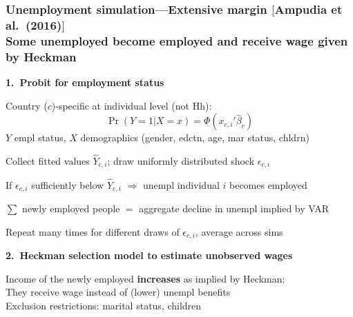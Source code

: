 \documentclass[pdflatex,aspectratio=169]{beamer}
\newcommand{\jemph}[1]{{\color{StataDarkBlue}#1}}
\newcommand{\jbemph}[1]{\textbf{\color{SlideNavy}#1}}
\begin{document}
\begin{frame}\frametitle{\bf\large Unemployment simulation---Extensive margin {\scriptsize$[$Ampudia et al.\ (2016)$]$}\\
\small Some unemployed become employed and receive wage given by Heckman}
\begin{block}{\jbemph{\small 1.\ Probit for employment status}}
\small
\bi
\setlength{\itemsep}{0mm}
\item Country ($c$)-specific at individual level (not Hh): $$\Pr(Y=1|X=x) = \Phi(x_{c,i}'\hat\beta_c)$$
$Y$ empl status, $X$ demographics (gender, edctn, age, mar status, chldrn)
\item Collect fitted values $\hat Y_{c,i}$; draw \jemph{uniformly distributed} shock $\epsilon_{c,i}$
\item \jemph{If $\epsilon_{c,i}$ sufficiently below $\hat Y_{c,i}$ $\Rightarrow$ unempl individual $i$ becomes employed}
\item \jemph{$\sum$ newly employed people ${}={}$ aggregate decline in unempl implied by VAR}
\item Repeat many times for different draws of $\epsilon_{c,i}$, average across sims
\ei
\end{block}

\begin{block}{\jbemph{\small 2.\ Heckman selection model to estimate unobserved wages}}
\small
\bi
\item \jemph{Income of the newly employed \jbemph{increases} as implied by Heckman:}\\[0mm]
They receive wage instead of (lower) unempl benefits\\
{\scriptsize{Exclusion restrictions: marital status, children}}
\ei
\end{block}

\end{frame}

\end{document}
